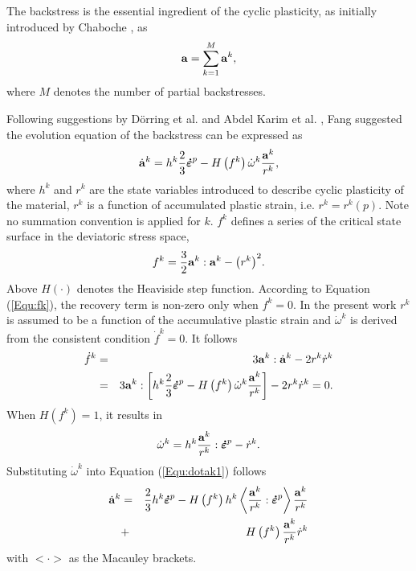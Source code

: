 \documentclass[preprint,5p,twocolumn,11pt,sort&compress]{elsarticle}
\newcommand{\dotbfepsilon}{{\mbox{\boldmath{$\dot\varepsilon$}}}}
\newcommand{\bfa}{{\bf a}}
\begin{document}
The backstress is the essential ingredient of the cyclic plasticity, as initially introduced by Chaboche \cite{Chaboche1986149}, as
\begin{equation}
\bfa = \sum\limits_{k = 1}^M {{\bfa^k}},
\end{equation}
where $M$ denotes the number of partial backstresses.

Following suggestions by D\"orring et al. \cite{Doerring2003} and Abdel Karim et al. \cite{AbdelKarim20051303}, Fang \cite{fang2015cyclic} suggested the evolution equation of the backstress can be expressed as
\begin{equation}
\label{Equ:dotak1}
{\dot\bfa^k} = {h^k}\frac{2}{3}{\dotbfepsilon^p} - H\left( {{f^k}} \right){\dot \omega ^k}\frac{{{\bfa^k}}}{{{r^k}}},
\end{equation}
where ${{{h}}^k} $ and ${{{r}}^k} $ are the state variables introduced to describe cyclic plasticity of the material, $r^k$ is a function of accumulated plastic strain, i.e. ${r^k} = {r^k}\left( p \right)$.  Note no summation convention is applied for $k$. ${{{f}}^k} $ defines a series of the critical state surface in the deviatoric stress space,
\begin{equation}
\label{Equ:fk}
{f^k} = \frac{3}{2}{\bfa^k}:{\bfa^k} - {\left( {{r^k}} \right)^2}.
\end{equation}
Above  $H(\cdot)$ denotes the Heaviside step function. According to Equation (\ref{Equ:fk}), the recovery term is non-zero only when ${f^k} = 0$. In the present work  $r^k$ is assumed to be a function of the accumulative plastic strain and ${\dot \omega ^k}$ is derived from the consistent condition ${\dot f^k} = 0$. It follows
\begin{eqnarray}
\label{Equ:dotfk}
{\dot f^k} &=& 3{\bfa^k}:{\dot\bfa^k} - 2{r^k}{\dot r^k} \\ \nonumber
&=& 3{\bfa^k}:\left[ {{h^k}\frac{2}{3}{{\dotbfepsilon}^p} - H\left( {{f^k}} \right){{\dot \omega }^k}\frac{{{\bfa^k}}}{{{r^k}}}} \right] - 2{r^k}{\dot r^k} = 0.
\end{eqnarray}
When $H\left( {{f^k}} \right) = 1$, it results in
\begin{equation}
\label{Equ:dotomegak}
{\dot \omega ^k} = {h^k}\frac{{{\bfa^k}}}{{{r^k}}}:{\dotbfepsilon^p} - {\dot r^k}.
\end{equation}
Substituting ${\dot \omega ^k}$ into Equation (\ref{Equ:dotak1}) follows
\begin{eqnarray}
\label{Equ:dotak2}\nonumber
{\dot\bfa^k} &=& \frac{2}{3}{h^k}{\dotbfepsilon^p} - H\left( {{f^k}} \right){h^k}\left\langle {\frac{{{\bfa^k}}}{{{r^k}}}:{{\dotbfepsilon}^p}} \right\rangle \frac{{{\bfa^k}}}{{{r^k}}} \\
&+& H\left( {{f^k}} \right)\frac{{{\bfa^k}}}{{{r^k}}}{\dot r^k}
\end{eqnarray}
with $<\cdot>$ as the Macauley brackets.
\end{document}
